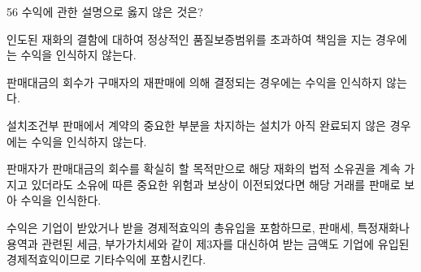 \begin{question}{56}
수익에 관한 설명으로 옳지 않은 것은?
\begin{choices}
  \item 인도된 재화의 결함에 대하여 정상적인 품질보증범위를 초과하여 책임을 지는 경우에는 수익을 인식하지 않는다.
  \item 판매대금의 회수가 구매자의 재판매에 의해 결정되는 경우에는 수익을 인식하지 않는다.
  \item 설치조건부 판매에서 계약의 중요한 부분을 차지하는 설치가 아직 완료되지 않은 경우에는 수익을 인식하지 않는다.
  \item 판매자가 판매대금의 회수를 확실히 할 목적만으로 해당 재화의 법적 소유권을 계속 가지고 있더라도 소유에 따른 중요한 위험과 보상이 이전되었다면 해당 거래를 판매로 보아 수익을 인식한다.
  \item 수익은 기업이 받았거나 받을 경제적효익의 총유입을 포함하므로, 판매세, 특정재화나 용역과 관련된 세금, 부가가치세와 같이 제3자를 대신하여 받는 금액도 기업에 유입된 경제적효익이므로 기타수익에 포함시킨다.
\end{choices}
\end{question}
